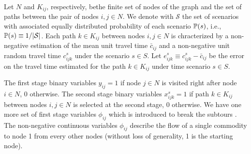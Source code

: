 Let $N$ and $K_{ij}$, respectively, bethe finite set of nodes of the graph and the set of paths between the pair of nodes $i,j\in N$. We denote with $\mathcal{S}$ the set of scenarios with associated equally distributed probability of each scenario $\operatorname*{\mathbb{P}}(s)$, i.e., $\operatorname*{\mathbb{P}}(s)\equiv 1/|\mathcal{S}|$. Each path $k\in K_{ij}$ between nodes $i,j\in N$ is chracterized by a non-negative estimation of the mean unit travel time $\bar{c}_{ij}$ and a non-negative unit random travel time $c_{ijk}^{s}$ under the scenario $s\in S$. Let $e_{ijk}^{s}\equiv c_{ijk}^{s}-\bar{c}_{ij}$ be the error on the travel time estimated for the path $k\in K_{ij}$ under time scenario $s\in S$.

The first stage binary variables $y_{ij}=1$ if node $j\in N$ is visited right after node $i\in N$, 0 otherwise. The second stage binary variables $x_{ijk}^{s}=1$ if path $k\in K_{ij}$ between nodes $i,j\in N$ is selected at the second stage, 0 otherwise. We have one more set of first stage variables $\phi_{ij}$ which is introduced to break the subtours \cite{journal:LSD1990}. The non-negative continuous variables $\phi_{ij}$ describe the flow of a single commodity to node 1 from every other nodes (without loss of generality, 1 is the starting node). 

